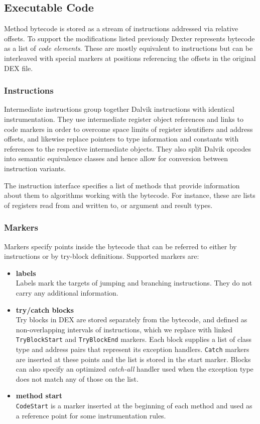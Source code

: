 \documentclass[12pt,twoside,notitlepage]{report}
\begin{document}
\subsection{Executable Code}

Method bytecode is stored as a stream of instructions addressed via relative offsets. To support the modifications listed previously Dexter represents bytecode as a list of \emph{code elements}. These are mostly equivalent to instructions but can be interleaved with special markers at positions referencing the offsets in the original DEX file.

\subsubsection{Instructions}

Intermediate instructions group together Dalvik instructions with identical instrumentation. They use intermediate register object references and links to code markers in order to overcome space limits of register identifiers and address offsets, and likewise replace pointers to type information and constants with references to the respective intermediate objects. They also split Dalvik opcodes into semantic equivalence classes and hence allow for conversion between instruction variants.

The instruction interface specifies a list of methods that provide information about them to algorithms working with the bytecode. For instance, these are lists of registers read from and written to, or argument and result types.

\subsubsection{Markers}

Markers specify points inside the bytecode that can be referred to either by instructions or by try-block definitions. Supported markers are:
\begin{itemize}
\item \textbf{labels} \\
Labels mark the targets of jumping and branching instructions. They do not carry any additional information.
\item \textbf{try/catch blocks} \\
Try blocks in DEX are stored separately from the bytecode, and defined as non-overlapping intervals of instructions, which we replace with linked \verb$TryBlockStart$ and \verb$TryBlockEnd$ markers. Each block supplies a list of class type and address pairs that represent its exception handlers. \verb$Catch$ markers are inserted at these points and the list is stored in the start marker. Blocks can also specify an optimized \emph{catch-all} handler used when the exception type does not match any of those on the list.
\item \textbf{method start} \\
\verb$CodeStart$ is a marker inserted at the beginning of each method and used as a reference point for some instrumentation rules.
\end{itemize}
\end{document}
